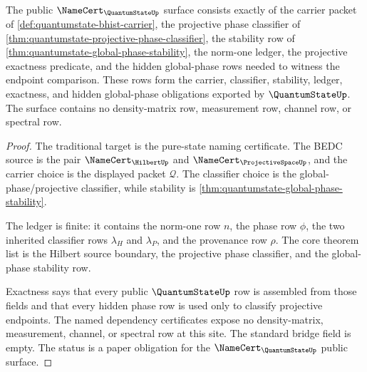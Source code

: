 \begin{theorem}
\label{thm:quantumstate-namecert-obligation-surface}
The public $\NameCert_{\QuantumStateUp}$ surface consists exactly of the
carrier packet of \autoref{def:quantumstate-bhist-carrier}, the projective
phase classifier of \autoref{thm:quantumstate-projective-phase-classifier}, the
stability row of \autoref{thm:quantumstate-global-phase-stability}, the
norm-one ledger, the projective exactness predicate, and the hidden
global-phase rows needed to witness the endpoint comparison. These rows form
the carrier, classifier, stability, ledger, exactness, and hidden
global-phase obligations exported by $\QuantumStateUp$. The surface contains
no density-matrix row, measurement row, channel row, or spectral row.
\end{theorem}
\begin{proof}
The traditional target is the pure-state naming certificate. The BEDC source
is the pair $\NameCert_{\HilbertUp}$ and $\NameCert_{\ProjectiveSpaceUp}$, and
the carrier choice is the displayed packet $\mathcal{Q}$. The classifier choice
is the global-phase/projective classifier, while stability is
\autoref{thm:quantumstate-global-phase-stability}.

The ledger is finite: it contains the norm-one row $n$, the phase row $\phi$,
the two inherited classifier rows $\lambda_H$ and $\lambda_P$, and the
provenance row $\rho$. The core theorem list is the Hilbert source boundary,
the projective phase classifier, and the global-phase stability row.

Exactness says that every public $\QuantumStateUp$ row is assembled from those
fields and that every hidden phase row is used only to classify projective
endpoints. The named dependency certificates expose no density-matrix,
measurement, channel, or spectral row at this site. The standard bridge field
is empty. The status is a paper obligation for the $\NameCert_{\QuantumStateUp}$
public surface.
\end{proof}

